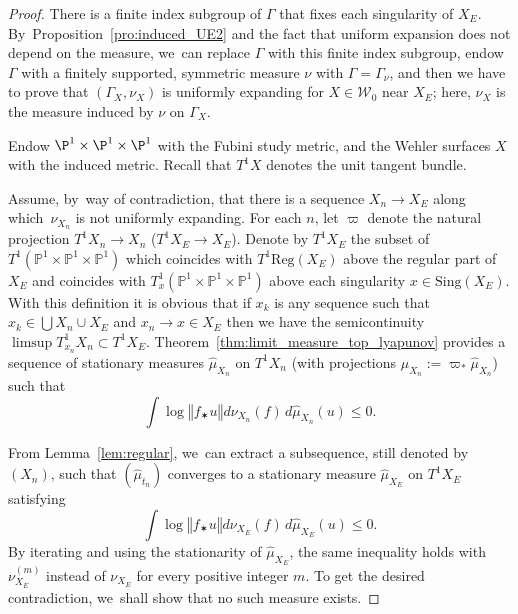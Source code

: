 \documentclass[JEP,XML,SOM,Unicode,published]{cedram}
\newcommand{\norm}[1]{{\left\Vert#1\right\Vert}}
\newcommand{\pu}{{\mathbb{P}^1}}
\newcommand{\lrpar}[1]{\left(#1\right)}
\newcommand{\cW}{\mathcal{W}}
\newcommand{\Sing}{{\mathrm{Sing}}}
\theoremstyle{plain}
\theoremstyle{definition}
\begin{document}
\begin{proof}
There is a finite index subgroup of $\Gamma$ that
fixes each singularity of $X_E$. By~Proposition~\ref{pro:induced_UE2} and the fact that uniform expansion does not depend on the measure, we~can replace $\Gamma$ with this finite index subgroup, endow $\Gamma$ with a finitely supported, symmetric measure $\nu$ with $\Gamma=\Gamma_\nu$, and then we have to prove that $(\Gamma_X, \nu_X)$ is uniformly expanding for $X\in \cW_0$ near $X_E$; here, $\nu_X$ is the measure induced by $\nu$ on $\Gamma_X$.

Endow $\P^1\times \P^1\times \P^1$ with the Fubini study metric, and the Wehler surfaces $X$ with the induced metric. Recall that $T^1X$ denotes the unit tangent bundle.

Assume, by~way of contradiction, that there is a sequence
$X_n\to X_E$ along which~$\nu_{X_n}$ is not uniformly expanding.
For each $n$, let $\varpi$ denote the natural projection $T^1X_n\to X_n$ (\resp $T^1X_E\to X_E$).
Denote by $T^1X_E$ the subset of $T^1(\pu\times \pu\times \pu)$ which coincides with $T^1 \mathrm{Reg}(X_E)$ above the regular part of $X_E$ and coincides with $T^1_x(\pu\times \pu\times \pu)$ above each singularity $x\in \Sing(X_E)$. With this definition it is obvious that
if $x_k$ is any sequence such that $x_k\in \bigcup X_n\cup X_E$ and $x_n\to x\in X_E$
then we have the semicontinuity
$ \limsup T^1_{x_n}X_n\subset T^1X_E$. Theorem~\ref{thm:limit_measure_top_lyapunov}
provides a sequence of stationary measures $\hat \mu_{X_n}$ on $T^1X_n$ (with projections $\mu_{X_n}:=\varpi_*\hat\mu_{X_n}$) such that
\begin{equation*}
\int \log\norm{f_\varstar u} d\nu_{X_n}(f) \, d\hat \mu_{X_n} (u)\leq 0.
\end{equation*}

From Lemma~\ref{lem:regular}, we~can extract a subsequence, still denoted by $(X_n)$,
such that $\lrpar{\hat \mu_{t_n}}$ converges to a stationary measure $\hat \mu_{X_E}$ on $T^1X_E$ satisfying
\begin{equation*}
\int \log\norm{f_\varstar u} d\nu_{X_E}(f) \, d\hat \mu_{X_E} (u)\leq 0.
\end{equation*}
By iterating and using the stationarity of $\hat \mu_{X_E}$, the same inequality holds with $\nu_{X_E}^{(m)}$ instead of $\nu_{X_E}$ for every positive integer $m$. To get the desired contradiction, we~shall show that no such measure exists.


\end{proof}
\end{document}
